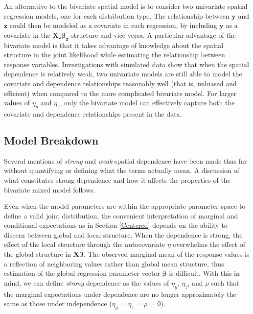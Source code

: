 \documentclass[12pt, a4paper, twoside]{article}
\begin{document}
An alternative to the bivariate spatial model is to consider two univariate spatial regression models, one for each distribution type. The relationship between $\boldsymbol{y}$ and $\boldsymbol{z}$ could then be modeled as a covariate in each regression, by including $\boldsymbol{y}$ as a covariate in the $\mathbf{X_z}\boldsymbol{\beta_z}$ structure and vice versa. A particular advantage of the bivariate model is that it takes advantage of knowledge about the spatial structure in the joint likelihood while estimating the relationship between response variables. Investigations with simulated data show that when the spatial dependence is relatively weak, two univariate models are still able to model the covariate and dependence relationships reasonably well (that is, unbiased and efficient) when compared to the more complicated bivariate model. For larger values of $\eta_y$ and $\eta_z$, only the bivariate model can effectively capture both the covariate and dependence relationships present in the data.

\subsection{Model Breakdown} \label{breakdown}
Several mentions of \textit{strong} and \textit{weak} spatial dependence have been made thus far without quantifying or defining what the terms actually mean. A discussion of what constitutes strong dependence and how it affects the properties of the bivariate mixed model follows.

Even when the model parameters are within the appropriate parameter space to define a valid joint distribution, the convenient interpretation of marginal and conditional expectations as in Section \ref{Centered} depends on the ability to discern between global and local structure. When the dependence is strong, the effect of the local structure through the autocovariate $\eta$ overwhelms the effect of the global structure in $\boldsymbol{X\beta}$. The observed marginal mean of the response values is a reflection of neighboring values rather than global mean structure, thus estimation of the global regression parameter vector $\boldsymbol{\beta}$ is difficult. With this in mind, we can define \textit{strong} dependence as the values of $\eta_y$, $\eta_z$, and $\rho$ such that the marginal expectations under dependence are no longer approximately the same as those under independence ($\eta_y$ = $\eta_z$ = $\rho$ = 0).
\end{document}
